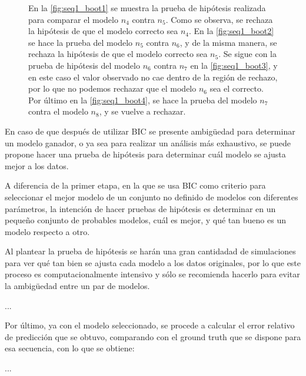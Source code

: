 \begin{figure}[t!]
{\begin{subfigure}[b]{0.7\textwidth}
      \caption{}
      \label{fig:seq1_boot4}
    \end{subfigure}
  }
  \caption[Secuencia 1: Pruebas de hipótesis usando bootstrap]{En la \autoref{fig:seq1_boot1} se muestra la prueba de hipótesis realizada para comparar el modelo $n_4$ contra $n_5$. Como se observa, se rechaza la hipótesis de que el modelo correcto sea $n_4$. En la \autoref{fig:seq1_boot2} se hace la prueba del modelo $n_5$ contra $n_6$, y de la misma manera, se rechaza la hipótesis de que el modelo correcto sea $n_5$. Se sigue con la prueba de hipótesis del modelo $n_6$ contra $n_7$ en la \autoref{fig:seq1_boot3}, y en este caso el valor observado no cae dentro de la región de rechazo, por lo que no podemos rechazar que el modelo $n_6$ sea el correcto. Por último en la \autoref{fig:seq1_boot4}, se hace la prueba del modelo $n_7$ contra el modelo $n_8$, y se vuelve a rechazar.}
  \label{fig:seq1_boot}
\end{figure}

En caso de que después de utilizar BIC se presente ambigüedad para determinar un modelo ganador, o ya sea para realizar un análisis más exhaustivo, se puede propone hacer una prueba de hipótesis para determinar cuál modelo se ajusta mejor a los datos.

A diferencia de la primer etapa, en la que se usa BIC como criterio para  seleccionar el mejor modelo de un conjunto no definido de modelos con diferentes parámetros, la intención de hacer pruebas de hipótesis es determinar en un pequeño conjunto de probables modelos, cuál es mejor, y qué tan bueno es un modelo respecto a otro.

Al plantear la prueba de hipótesis se harán una gran cantidadad de simulaciones para ver qué tan bien se ajusta cada modelo a los datos originales, por lo que este proceso es computacionalmente intensivo y sólo se recomienda hacerlo para evitar la ambigüedad entre un par de modelos.

...

Por último, ya con el modelo seleccionado, se procede a calcular el error relativo de predicción que se obtuvo, comparando con el ground truth que se dispone para esa secuencia, con lo que se obtiene: 

...

